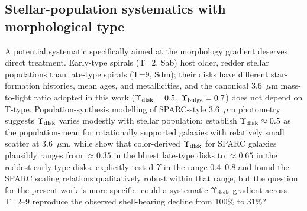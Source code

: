 \subsection{Stellar-population systematics with morphological type}
\label{sec:ml_systematics}

A potential systematic specifically aimed at the morphology gradient deserves direct treatment. Early-type spirals (T=2, Sab) host older, redder stellar populations than late-type spirals (T=9, Sdm); their disks have different star-formation histories, mean ages, and metallicities, and the canonical 3.6~$\mu$m mass-to-light ratio adopted in this work ($\Upsilon_{\rm disk} = 0.5$, $\Upsilon_{\rm bulge} = 0.7$) does not depend on T-type. Population-synthesis modelling of SPARC-style 3.6~$\mu$m photometry suggests $\Upsilon_{\rm disk}$ varies modestly with stellar population: \citet{McGaugh2014} establish $\Upsilon_{\rm disk} \approx 0.5$ as the population-mean for rotationally supported galaxies with relatively small scatter at 3.6~$\mu$m, while \citet{Schombert2019,Schombert2022} show that color-derived $\Upsilon_{\rm disk}$ for SPARC galaxies plausibly ranges from $\approx 0.35$ in the bluest late-type disks to $\approx 0.65$ in the reddest early-type disks. \citet{Lelli2016} explicitly tested $\Upsilon$ in the range $0.4$--$0.8$ and found the SPARC scaling relations qualitatively robust within that range, but the question for the present work is more specific: could a systematic $\Upsilon_{\rm disk}$ gradient across T=2--9 reproduce the observed shell-bearing decline from 100\% to 31\%?

